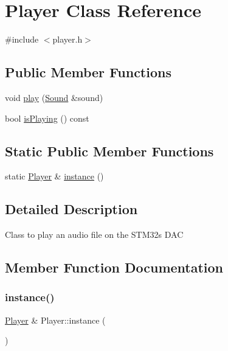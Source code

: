 \hypertarget{class_player}{}\section{Player Class Reference}
\label{class_player}


{\ttfamily \#include $<$player.\+h$>$}

\subsection*{Public Member Functions}
\begin{DoxyCompactItemize}
\item 
void \hyperlink{class_player_a895c8c46a9862e1c424720be3aa5e7d1}{play} (\hyperlink{class_sound}{Sound} \&sound)
\item 
bool \hyperlink{class_player_a06b5d53d568f357f77df80d0859fe8db}{is\+Playing} () const
\end{DoxyCompactItemize}
\subsection*{Static Public Member Functions}
\begin{DoxyCompactItemize}
\item 
static \hyperlink{class_player}{Player} \& \hyperlink{class_player_a2bf5cfb2a54c9fde1432fed9eb46fe49}{instance} ()
\end{DoxyCompactItemize}


\subsection{Detailed Description}
Class to play an audio file on the S\+T\+M32\textquotesingle{}s D\+AC 

\subsection{Member Function Documentation}
\mbox{\label{class_player_a2bf5cfb2a54c9fde1432fed9eb46fe49}} 
\subsubsection{\texorpdfstring{instance()}{instance()}}
{\footnotesize\ttfamily \hyperlink{class_player}{Player} \& Player\+::instance (\begin{DoxyParamCaption}{ }\end{DoxyParamCaption})\hspace{0.3cm}{\ttfamily [static]}}

